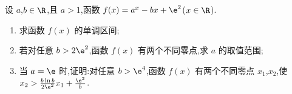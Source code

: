 \begin{problem}
设 \(a\),\(b\in\R\),且 \(a>1\),函数 \(f(x)=a^x-bx+\e^2\)(\(x\in\R\)).

\begin{enumerate}
\item 求函数 \(f(x)\) 的单调区间;

\item 若对任意 \(b>2\e^2\),函数 \(f(x)\) 有两个不同零点,求 \(a\) 的取值范围;

\item 当 \(a=\e\) 时,证明:对任意 \(b>\e^4\),函数 \(f(x)\) 有两个不同零点 \(x_1\),\(x_2\),使 \(x_2>\frac{b\ln b}{2\e^2}x_1+\frac{\e^2}{b}\).
\end{enumerate}
\end{problem}

